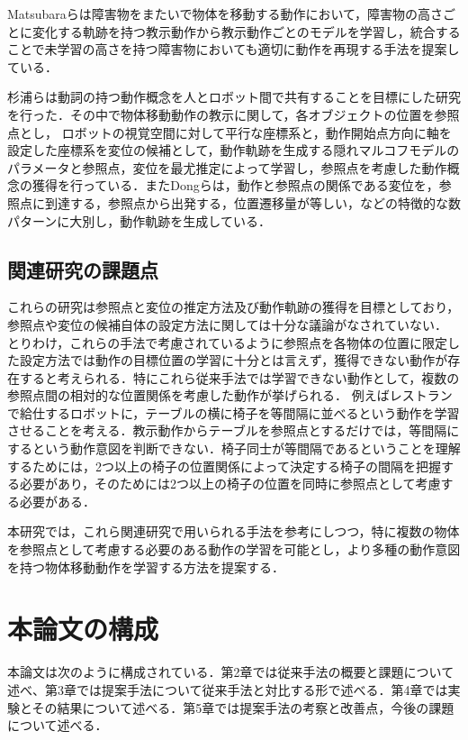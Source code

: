 Matsubaraら\cite{matsubara}は障害物をまたいで物体を移動する動作において，障害物の高さごとに変化する軌跡を持つ教示動作から教示動作ごとのモデルを学習し，統合することで未学習の高さを持つ障害物においても適切に動作を再現する手法を提案している．

杉浦ら\cite{sugiura}は動詞の持つ動作概念を人とロボット間で共有することを目標にした研究を行った．その中で物体移動動作の教示に関して，各オブジェクトの位置を参照点とし，
ロボットの視覚空間に対して平行な座標系と，動作開始点方向に軸を設定した座標系を変位の候補として，動作軌跡を生成する隠れマルコフモデル\cite{hmm}のパラメータと参照点，変位を最尤推定によって学習し，参照点を考慮した動作概念の獲得を行っている．またDongら\cite{dong}は，動作と参照点の関係である変位を，参照点に到達する，参照点から出発する，位置遷移量が等しい，などの特徴的な数パターンに大別し，動作軌跡を生成している．

\subsection{関連研究の課題点}\label{kadai}

これらの研究は参照点と変位の推定方法及び動作軌跡の獲得を目標としており，参照点や変位の候補自体の設定方法に関しては十分な議論がなされていない．
とりわけ，これらの手法で考慮されているように参照点を各物体の位置に限定した設定方法では動作の目標位置の学習に十分とは言えず，獲得できない動作が存在すると考えられる．特にこれら従来手法では学習できない動作として，複数の参照点間の相対的な位置関係を考慮した動作が挙げられる．
例えばレストランで給仕するロボットに，テーブルの横に椅子を等間隔に並べるという動作を学習させることを考える．教示動作からテーブルを参照点とするだけでは，等間隔にするという動作意図を判断できない．椅子同士が等間隔であるということを理解するためには，2つ以上の椅子の位置関係によって決定する椅子の間隔を把握する必要があり，そのためには2つ以上の椅子の位置を同時に参照点として考慮する必要がある．

本研究では，これら関連研究で用いられる手法を参考にしつつ，特に複数の物体を参照点として考慮する必要のある動作の学習を可能とし，より多種の動作意図を持つ物体移動動作を学習する方法を提案する．        

\section{本論文の構成}

本論文は次のように構成されている．第2章では従来手法の概要と課題について述べ、第3章では提案手法について従来手法と対比する形で述べる．第4章では実験とその結果について述べる．第5章では提案手法の考察と改善点，今後の課題について述べる．	
